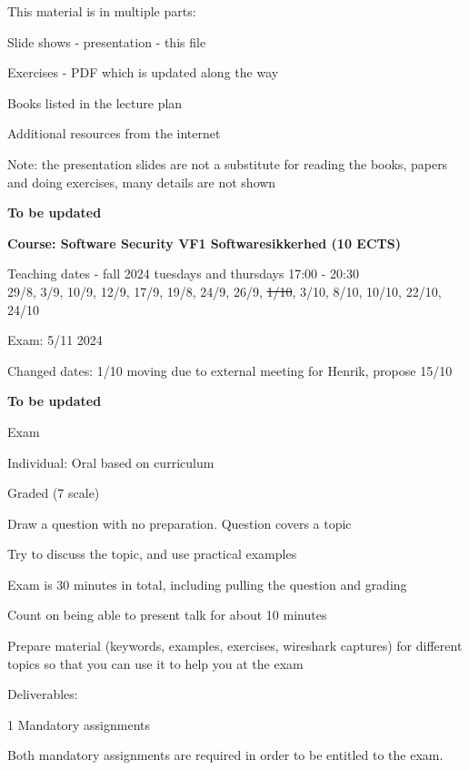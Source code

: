 \documentclass[Screen16to9,17pt]{foils}
\begin{document}
\begin{list1}
\item This material is in multiple parts:
\begin{list2}
\item Slide shows - presentation - this file
\item Exercises - PDF which is updated along the way
\end{list2}
\item Books listed in the lecture plan
\item Additional resources from the internet
\item Note: the presentation slides are not a substitute for reading the books, papers and doing exercises, many details are not shown
\end{list1}



{\bf To be updated}

{\bf Course: Software Security
VF1 Softwaresikkerhed (10 ECTS)}

Teaching dates - fall 2024 tuesdays and thursdays 17:00 - 20:30\\
29/8, 3/9, 10/9, 12/9, 17/9, 19/8, 24/9, 26/9, \sout{1/10}, 3/10, 8/10, 10/10, 22/10, 24/10

Exam: 5/11 2024

Changed dates: 1/10 moving due to external meeting for Henrik, propose 15/10


{\bf To be updated}
\begin{list2}
\item Exam
\item Individual: Oral based on curriculum
\item Graded (7 scale)
\item Draw a question with no preparation. Question covers a topic
\item Try to discuss the topic, and use practical examples
\item Exam is 30 minutes in total, including pulling the question and grading
\item Count on being able to present talk for about 10 minutes
\item Prepare material (keywords, examples, exercises, wireshark captures) for different topics so that you can use it to help you at the exam

\vskip 5mm
\item Deliverables:
\item 1 Mandatory assignments
\item Both mandatory assignments are required in order to be entitled to the exam.
\end{list2}
\end{document}
